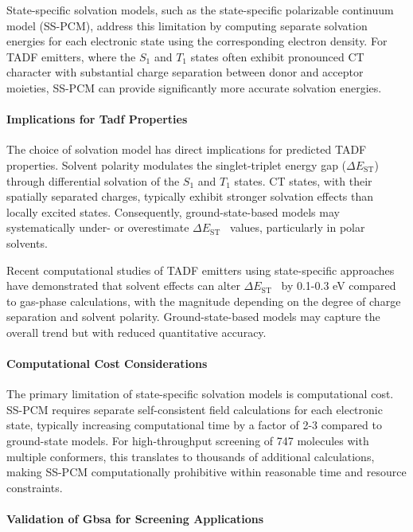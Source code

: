 \documentclass[journal=jcisd8,manuscript=article,keywords=true]{achemso}
\newcommand{\deltaest}{$\Delta E_{\text{ST}}$}
\begin{document}
State-specific solvation models, such as the state-specific polarizable continuum model (SS-PCM), address this limitation by computing separate solvation 
energies for each electronic state using the corresponding electron density.\cite{Improta2006,Tomasi2005} For TADF emitters, where the $S_1$ and $T_1$ states 
often exhibit pronounced CT character with substantial charge separation between donor and acceptor moieties, SS-PCM can provide significantly more accurate 
solvation energies.\cite{Moral2015}

\paragraph{Implications for Tadf Properties}

The choice of solvation model has direct implications for predicted TADF properties. Solvent polarity modulates the singlet-triplet energy gap (\deltaest) 
through differential solvation of the $S_1$ and $T_1$ states.\cite{ArticleRef1} CT states, with their spatially separated charges, typically exhibit stronger 
solvation effects than locally excited states. Consequently, ground-state-based models may systematically under- or overestimate \deltaest~ values, 
particularly in polar solvents.

Recent computational studies of TADF emitters using state-specific approaches have demonstrated that solvent effects can alter \deltaest~ by 0.1-0.3 eV 
compared to gas-phase calculations, with the magnitude depending on the degree of charge separation and solvent polarity.\cite{Moral2015} Ground-state-based 
models may capture the overall trend but with reduced quantitative accuracy.

\paragraph{Computational Cost Considerations}

The primary limitation of state-specific solvation models is computational cost. SS-PCM requires separate self-consistent field calculations for each electronic state, typically increasing computational time by a factor of 2-3 compared to ground-state models.\cite{Tomasi2005} For high-throughput screening of 747 molecules with multiple conformers, this translates to thousands of additional calculations, making SS-PCM computationally prohibitive within reasonable time and resource constraints.

\paragraph{Validation of Gbsa for Screening Applications}
\end{document}
